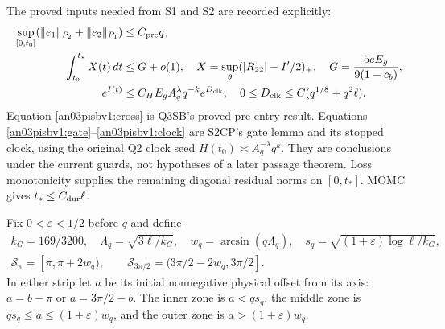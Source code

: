 \documentclass[11pt]{article}
\numberwithin{equation}{section}
\theoremstyle{remark}\newtheorem{remark}[theorem]{Remark}
\newcommand{\dd}{\,d}
\newcommand{\Sp}{\mathcal S_\pi}
\newcommand{\Ss}{\mathcal S_{3\pi/2}}
\begin{document}
The proved inputs needed from S1 and S2 are recorded explicitly:
\begin{align}
 \sup_{[0,t_0]}(\|e_1\|_{P_2}+\|e_2\|_{P_1})
       &\le C_{\rm pre}q,                         \label{an03pisbv1:cross}\\
 \int_{t_0}^{t_*}X(t)\dd t
       &\le G+o(1),\quad
 X=\sup_\theta(|R_{22}|-I'/2)_+,\quad
 G=\frac{5eE_g}{9(1-c_b)},                         \label{an03pisbv1:gate}\\
 e^{I(t)}
       &\le C_H E_g A_q^\lambda q^{-k}e^{D_{\rm clk}},
 \quad 0\le D_{\rm clk}\le C(q^{1/8}+q^2\ell).
                                                        \label{an03pisbv1:clock}
\end{align}
Equation \eqref{an03pisbv1:cross} is Q3SB's proved pre-entry result.
Equations \eqref{an03pisbv1:gate}--\eqref{an03pisbv1:clock} are S2CP's
gate lemma and its stopped clock, using the original Q2 clock seed
$H(t_0)\asymp A_q^{-\lambda}q^k$. They are conclusions under the
current guards, not hypotheses of a later passage theorem.
Loss monotonicity supplies the remaining diagonal residual norms
on $[0,t_*]$. MOMC gives $t_*\le C_{\rm dur}\ell$.

Fix $0<\varepsilon<1/2$ before $q$ and define
\begin{equation}
 \begin{gathered}
 k_G=169/3200,\quad \Lambda_q=\sqrt{3\ell/k_G},\quad
 w_q=\arcsin(q\Lambda_q),\quad
 s_q=\sqrt{(1+\varepsilon)\log\ell/k_G},\\
 \Sp=[\pi,\pi+2w_q),\qquad
 \Ss=(3\pi/2-2w_q,3\pi/2].
 \end{gathered}                                   \label{an03pisbv1:zones}
\end{equation}
In either strip let $a$ be its initial nonnegative physical offset
from its axis: $a=b-\pi$ or $a=3\pi/2-b$.
The inner zone is $a<qs_q$, the middle zone is
$qs_q\le a\le(1+\varepsilon)w_q$, and the outer zone is
$a>(1+\varepsilon)w_q$.
\end{document}
